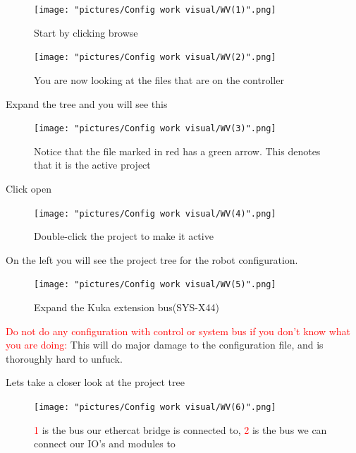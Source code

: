 \documentclass{article}
\begin{document}
\begin{figure}[!h]
    \centering
    \texttt{[image: "pictures/Config work visual/WV(1)".png]}
    \caption{Start by clicking browse}
    \label{fig:my_label}
\end{figure}

\newpage

\begin{figure}[!h]
    \centering
    \texttt{[image: "pictures/Config work visual/WV(2)".png]}
    \caption{You are now looking at the files that are on the controller}
    \label{fig:my_label}
\end{figure}

Expand the tree and you will see this

\begin{figure}[!h]
    \centering
    \texttt{[image: "pictures/Config work visual/WV(3)".png]}
    \caption{Notice that the file marked in red has a green arrow. This denotes that it is the active project}
    \label{fig:my_label}
\end{figure}

Click open

\begin{figure}[!h]
    \centering
    \texttt{[image: "pictures/Config work visual/WV(4)".png]}
    \caption{Double-click the project to make it active}
    \label{fig:my_label}
\end{figure}

\newpage

On the left you will see the project tree for the robot configuration. 

\begin{figure}[!h]
    \centering
    \texttt{[image: "pictures/Config work visual/WV(5)".png]}
    \caption{Expand the Kuka extension bus(SYS-X44)}
    \label{fig:my_label}
\end{figure}



\textcolor{red}{Do not do any configuration with control or system bus if you don't know what you are doing:} This will do major damage to the configuration file, and is thoroughly hard to unfuck. 

\newpage

Lets take a closer look at the project tree

\begin{figure}[!h]
    \centering
    \texttt{[image: "pictures/Config work visual/WV(6)".png]}
    \caption{\textcolor{red}{1} is the bus our ethercat bridge is connected to, \textcolor{red}{2} is the bus we can connect our IO's and modules to}
    \label{fig:my_label}
\end{figure}
\end{document}

